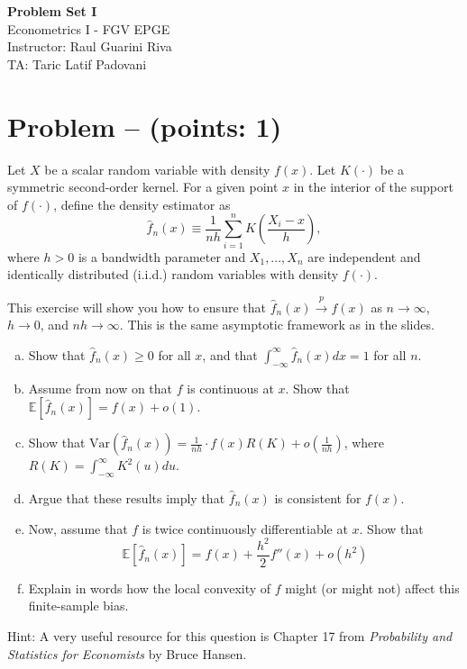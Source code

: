 \documentclass[11pt]{article}
\theoremstyle{definition}
\newcommand{\Var}{\mathrm{Var}}
\newcounter{problem}
\renewcommand{\theproblem}{\arabic{problem}}
\newcommand{\problem}[1]{
	\stepcounter{problem}
	\section*{Problem \theproblem{} -- (points: #1)}
}
\begin{document}
	\begin{center}
		{\LARGE{\textbf{Problem Set I}}}\\
		\vspace{0.2cm}
		Econometrics I - \textcolor{FGVBlue}{FGV EPGE}\\
		Instructor: Raul Guarini Riva \\
		TA: Taric Latif Padovani
	\end{center}

\problem{1}
Let $X$ be a scalar random variable with density $f(x)$. Let $K(\cdot)$ be a symmetric second-order kernel. For a given point $x$ in the interior of the support of $f(\cdot)$, define the density estimator as
\[\hat{f}_n(x) \equiv \frac{1}{nh} \sum_{i=1}^n K\left(\frac{X_i - x}{h}\right),\]
where \(h > 0\) is a bandwidth parameter and \(X_1, \ldots, X_n\) are independent and identically distributed (i.i.d.) random variables with density \(f(\cdot)\).

This exercise will show you how to ensure that $\hat{f}_n(x) \xrightarrow{p} f(x)$ as \(n \rightarrow \infty\), $h \rightarrow 0$, and $nh \rightarrow \infty$. This is the same asymptotic framework as in the slides.

\begin{enumerate}[a)]
	\item Show that $\hat{f}_n(x) \geq 0$ for all $x$, and that $\int_{-\infty}^{\infty} \hat{f}_n(x) dx = 1$ for all $n$.
	\item Assume from now on that $f$ is continuous at $x$. Show that $\mathbb{E}[\hat{f}_n(x)] = f(x) + o(1)$.
	\item Show that $\Var(\hat{f}_n(x)) = \frac{1}{nh}\cdot f(x)R(K) + o\left(\frac{1}{nh}\right)$, where \(R(K) = \int_{-\infty}^{\infty} K^2(u) du\).
	\item Argue that these results imply that $\hat{f}_n(x)$ is consistent for $f(x)$.
	\item Now, assume that $f$ is twice continuously differentiable at $x$. Show that 
	\begin{equation*}
		\mathbb{E}[\hat{f}_n(x)] = f(x) + \frac{h^2}{2}f''(x) + o(h^2)
	\end{equation*}
	\item Explain in words how the local convexity of $f$ might (or might not) affect this finite-sample bias.
\end{enumerate}

Hint: A very useful resource for this question is Chapter 17 from \textit{Probability and Statistics for Economists} by Bruce Hansen.
\end{document}
